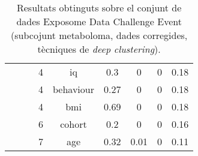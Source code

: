 \documentclass[CAT,BIB]{TFUOC}%
\begin{document}
\begin{table}
\begin{tabular}{@{}ccccccccc@{}}
            &  &  & 4 & iq & 0.3 & 0 & 0 & 0.18 \\
            &  &  & 4 & behaviour & 0.27 & 0 & 0 & 0.18 \\
            &  &  & 4 & bmi & 0.69 & 0 & 0 & 0.18 \\
            &  &  & 6 & cohort & 0.2 & 0 & 0 & 0.16 \\
            &  &  & 7 & age & 0.32 & 0.01 & 0 & 0.11 \\ \bottomrule
        \end{tabular}
        \caption[Exposome Data Challenge Event: resultats - part6]{
            Resultats obtinguts sobre el conjunt de dades Exposome Data Challenge Event
            (subcojunt metaboloma, dades corregides, tècniques de \textit{deep clustering}).
        }
        \label{t:results_exposome6}
    \end{table}
\end{document}

